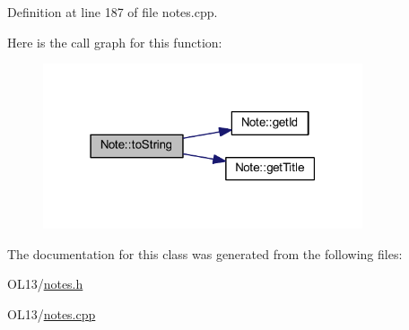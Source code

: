 Definition at line 187 of file notes.\+cpp.

Here is the call graph for this function\+:\nopagebreak
\begin{figure}[H]
\begin{center}
\leavevmode
\includegraphics[width=267pt]{class_note_a1bd4acfbde0b71d05fd7d4ca889bca2b_cgraph}
\end{center}
\end{figure}


The documentation for this class was generated from the following files\+:\begin{DoxyCompactItemize}
\item 
O\+L13/\hyperlink{notes_8h}{notes.\+h}\item 
O\+L13/\hyperlink{notes_8cpp}{notes.\+cpp}\end{DoxyCompactItemize}
